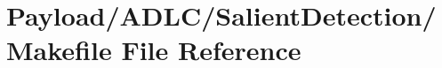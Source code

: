 \hypertarget{Payload_2ADLC_2SalientDetection_2Makefile}{\section{Payload/\-A\-D\-L\-C/\-Salient\-Detection/\-Makefile File Reference}
\label{Payload_2ADLC_2SalientDetection_2Makefile}
}
